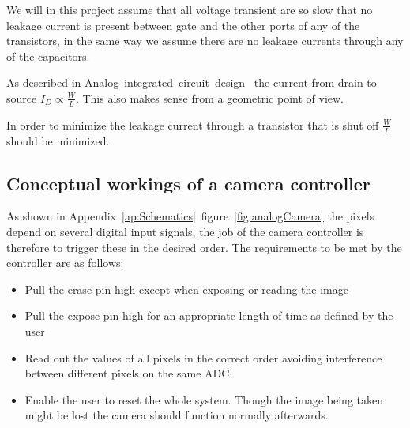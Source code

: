 We will in this project assume that all voltage transient are so slow that no leakage current is present between gate and the other ports of any of the transistors,
in the same way we assume there are no leakage currents through any of the capacitors.

As described in Analog~integrated~circuit~design~\cite{AnalogBook} the current from drain to source $I_D \propto \frac{W}{L}$.
This also makes sense from a geometric point of view.

In order to minimize the leakage current through a transistor that is shut off $\frac{W}{L}$ should be minimized.

\subsection{Conceptual workings of a camera controller}

As shown in Appendix~\ref{ap:Schematics}~figure~\ref{fig:analogCamera} the pixels depend on several digital input signals,
the job of the camera controller is therefore to trigger these in the desired order.
The requirements to be met by the controller are as follows:

\begin{itemize}
\item Pull the erase pin high except when exposing or reading the image
\item Pull the expose pin high for an appropriate length of time as defined by the user
\item Read out the values of all pixels in the correct order avoiding interference between different pixels on the same ADC.
\item Enable the user to reset the whole system. Though the image being taken might be lost the camera should function normally afterwards.
\end{itemize}
